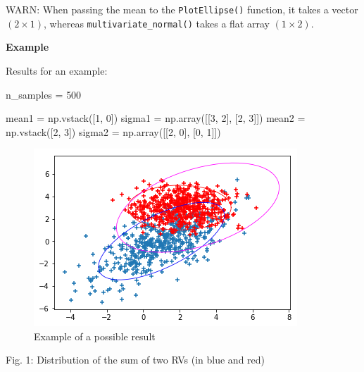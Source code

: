 \documentclass[11pt]{article}
\newenvironment{Shaded}{}{}
\newcommand{\DecValTok}[1]{\textcolor[rgb]{0.25,0.63,0.44}{{#1}}}
\newcommand{\NormalTok}[1]{{#1}}
\newcommand{\OperatorTok}[1]{\textcolor[rgb]{0.40,0.40,0.40}{{#1}}}
\begin{document}
WARN: When passing the mean to the \texttt{PlotEllipse()} function, it
takes a vector \((2 \times 1)\), whereas \texttt{multivariate\_normal()}
takes a flat array \((1 \times 2).\)

\textbf{Example}

Results for an example:

\begin{Shaded}
\begin{Highlighting}[]
\NormalTok{    n\_samples }\OperatorTok{=} \DecValTok{500}
    
\NormalTok{    mean1 }\OperatorTok{=}\NormalTok{ np.vstack([}\DecValTok{1}\NormalTok{, }\DecValTok{0}\NormalTok{])}
\NormalTok{    sigma1 }\OperatorTok{=}\NormalTok{ np.array([[}\DecValTok{3}\NormalTok{, }\DecValTok{2}\NormalTok{], [}\DecValTok{2}\NormalTok{, }\DecValTok{3}\NormalTok{]])}
\NormalTok{    mean2 }\OperatorTok{=}\NormalTok{ np.vstack([}\DecValTok{2}\NormalTok{, }\DecValTok{3}\NormalTok{])}
\NormalTok{    sigma2 }\OperatorTok{=}\NormalTok{ np.array([[}\DecValTok{2}\NormalTok{, }\DecValTok{0}\NormalTok{], [}\DecValTok{0}\NormalTok{, }\DecValTok{1}\NormalTok{]]) }
\end{Highlighting}
\end{Shaded}

\begin{figure}
\centering
\includegraphics{images/fig2-3-1.png}
\caption{Example of a possible result}
\end{figure}

Fig. 1: Distribution of the sum of two RVs (in blue and red)
\end{document}
